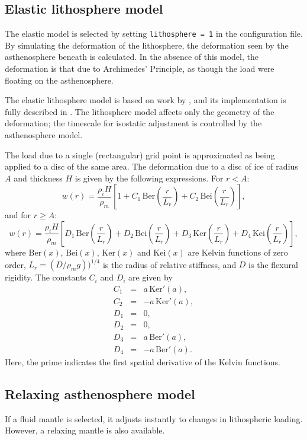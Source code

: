\subsection{Elastic lithosphere model}
The elastic model is selected by setting \texttt{lithosphere = 1} in the
configuration file. By simulating the deformation of the lithosphere, the
deformation seen by the asthenosphere beneath is calculated. In the absence of this
model, the deformation is that due to Archimedes' Principle, as though the
load were floating on the asthenosphere.

The elastic lithosphere model is based on work by \cite{Lambeck1980}, and its
implementation is fully described in \cite{Hagdorn2003}. The lithosphere
model affects only the geometry of the deformation; the timescale for
isostatic adjustment is controlled by the asthenosphere model. 

The load due to a single (rectangular) grid point is approximated as being
applied to a disc of the same area. The deformation due to a disc of ice of
radius $A$ and thickness $H$ is given by the following expressions. For $r<A$:
\begin{equation} 
w(r)=\frac{\rho_i H}{\rho_m}\left[1+C_1\,\mathrm{Ber}\left(\frac{r}{L_r}\right)+C_2\,\mathrm{Bei}\left(\frac{r}{L_r}\right)\right],
\end{equation}
and for $r\geq A$:
\begin{equation}
w(r)=\frac{\rho_i
  H}{\rho_m}\left[D_1\,\mathrm{Ber}\left(\frac{r}{L_r}\right)+D_2\,\mathrm{Bei}\left(\frac{r}{L_r}\right)
+D_3\,\mathrm{Ker}\left(\frac{r}{L_r}\right)+D_4\,\mathrm{Kei}\left(\frac{r}{L_r}\right)\right],
\end{equation}
where $\mathrm{Ber}(x)$, $\mathrm{Bei}(x)$, $\mathrm{Ker}(x)$ and
$\mathrm{Kei}(x)$ are Kelvin functions of zero order, $L_r=(D/\rho_m
g))^{1/4}$ is the radius of relative stiffness, and $D$ is the flexural
rigidity. The constants $C_i$ and $D_i$ are given by
\begin{equation}
\begin{array}{rcl}
C_1&=&a\,\mathrm{Ker}'(a),\\
C_2&=&-a\,\mathrm{Ker}'(a),\\
D_1&=&0,\\
D_2&=&0,\\
D_3&=&a\,\mathrm{Ber}'(a),\\
D_4&=&-a\,\mathrm{Ber}'(a).
\end{array}
\end{equation}
Here, the prime indicates the first spatial derivative of the Kelvin functions.

\subsection{Relaxing asthenosphere model}
If a fluid mantle is selected, it adjusts instantly to changes in lithospheric
loading. However, a relaxing mantle is also available.

